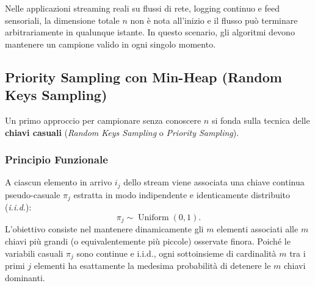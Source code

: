 Nelle applicazioni streaming reali su flussi di rete, logging continuo e feed sensoriali, la dimensione totale $n$ non è nota all'inizio e il flusso può terminare arbitrariamente in qualunque istante. In questo scenario, gli algoritmi devono mantenere un campione valido in ogni singolo momento.

\subsection{Priority Sampling con Min-Heap (Random Keys Sampling)}
Un primo approccio per campionare senza conoscere $n$ si fonda sulla tecnica delle \textbf{chiavi casuali} (\textit{Random Keys Sampling} o \textit{Priority Sampling}).

\subsubsection{Principio Funzionale}
A ciascun elemento in arrivo $i_j$ dello stream viene associata una chiave continua pseudo-casuale $\pi_j$ estratta in modo indipendente e identicamente distribuito (\textit{i.i.d.}):
\begin{equation}
  \pi_j \sim \operatorname{Uniform}(0, 1).
\end{equation}
L'obiettivo consiste nel mantenere dinamicamente gli $m$ elementi associati alle $m$ chiavi più grandi (o equivalentemente più piccole) osservate finora. Poiché le variabili casuali $\pi_j$ sono continue e i.i.d., ogni sottoinsieme di cardinalità $m$ tra i primi $j$ elementi ha esattamente la medesima probabilità di detenere le $m$ chiavi dominanti.

